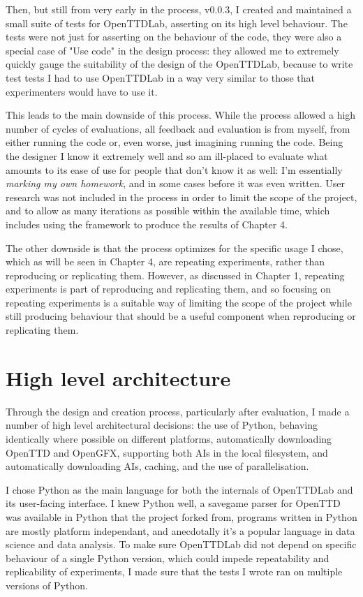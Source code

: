 \documentclass[logo,msc,dsti]{infthesis}    %
\begin{document}
Then, but still from very early in the process, v0.0.3, I created and maintained a small suite of tests for OpenTTDLab, asserting on its high level behaviour. The tests were not just for asserting on the behaviour of the code, they were also a special case of "Use code" in the design process: they allowed me to extremely quickly gauge the suitability of the design of the OpenTTDLab, because to write test tests I had to use OpenTTDLab in a way very similar to those that experimenters would have to use it.

This leads to the main downside of this process. While the process allowed a high number of cycles of evaluations, all feedback and evaluation is from myself, from either running the code or, even worse, just imagining running the code. Being the designer I know it extremely well and so am ill-placed to evaluate what amounts to its ease of use for people that don't know it as well: I'm essentially \emph{marking my own homework}, and in some cases before it was even written. User research was not included in the process in order to limit the scope of the project, and to allow as many iterations as possible within the available time, which includes using the framework to produce the results of Chapter 4.

The other downside is that the process optimizes for the specific usage I chose, which as will be seen in Chapter 4, are repeating experiments, rather than reproducing or replicating them. However, as discussed in Chapter 1, repeating experiments is part of reproducing and replicating them, and so focusing on repeating experiments is a suitable way of limiting the scope of the project while still producing behaviour that should be a useful component when reproducing or replicating them.


\section{High level architecture}

Through the design and creation process, particularly after evaluation, I made a number of high level architectural decisions: the use of Python, behaving identically where possible on different platforms, automatically downloading OpenTTD and OpenGFX, supporting both AIs in the local filesystem, and automatically downloading AIs, caching, and the use of parallelisation.

I chose Python as the main language for both the internals of OpenTTDLab and its user-facing interface. I knew Python well, a savegame parser for OpenTTD was available in Python \cite{Stout2024} that the project forked from, programs written in Python are mostly platform independant, and anecdotally it's a popular language in data science and data analysis. To make sure OpenTTDLab did not depend on specific behaviour of a single Python version, which could impede repeatability and replicability of experiments, I made sure that the tests I wrote ran on multiple versions of Python.
\end{document}
